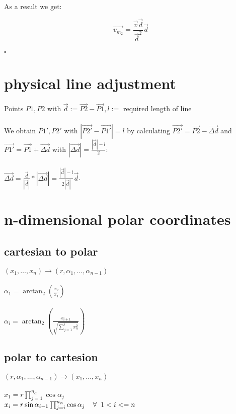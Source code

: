 \documentclass[a4paper]{article}
\newcommand{\spc}{\hspace{0.2cm}}
\begin{document}
As a result we get:

\begin{displaymath}
  \vec{v_{m_2}}=\frac{\vec{v}\vec{d}}{\vec{d}^2}\vec{d}
\end{displaymath}
\\
$\square$

\newpage
\section{physical line adjustment}
Points $P1,P2$ with $\vec{d}:=\vec{P2}-\vec{P1}, l:=$ required length of line\\\\
We obtain $P1',P2'$ with $|\vec{P2'}-\vec{P1'}|=l$ by calculating $\vec{P2'}=\vec{P2}-\vec{\Delta d}$ and $\vec{P1'}=\vec{P1}+\vec{\Delta d}$ with
$|\vec{\Delta d}|=\frac{|\vec{d}|-l}{2}$:\\\\
$\vec{\Delta d}=\frac{\vec{d}}{|\vec{d}|}*|\vec{\Delta d}|=\frac{|\vec{d}|-l}{2|\vec{d}|}\vec{d}$.

\newpage
\section{n-dimensional polar coordinates}
\subsection*{cartesian to polar}
$(x_1,\dots,x_n) \rightarrow (r,\alpha_1,\dots,\alpha_{n-1})$\\
\\
$\alpha_1=\arctan_2(\frac{x_2}{x_1})$\\\\
$\alpha_i=\arctan_2(\frac{x_{i+1}}{\sqrt{\sum_{j=1}^i{x_n^2}}})$
\subsection*{polar to cartesion}
$(r,\alpha_1,\dots,\alpha_{n-1}) \rightarrow (x_1,\dots,x_n)$\\
\\
$x_1=r\prod_{j=1}^{n_{\alpha}}{\cos\alpha_j}$\\
$x_i=r\sin\alpha_{i-1}\prod_{j=i}^{n_{\alpha}}\cos\alpha_j \spc\spc \forall\spc 1<i<=n$
\end{document}

